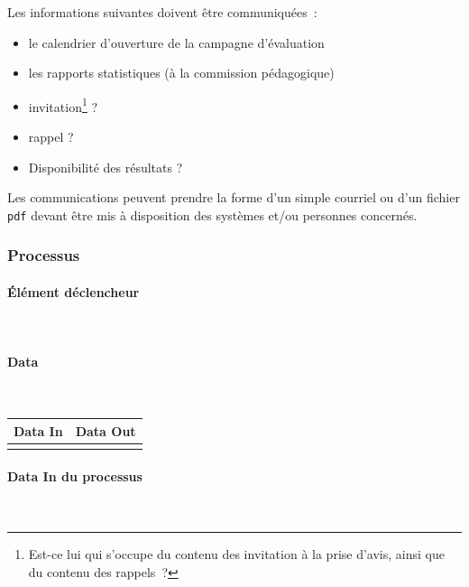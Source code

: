 \documentclass[a4paper,11pt]{report}
\begin{document}
\noindent Les informations suivantes doivent être communiquées~:
\begin{itemize}
	\item le calendrier d'ouverture de la campagne d'évaluation
	\item les rapports statistiques (à la commission pédagogique)
	\item invitation\footnote{Est-ce lui qui s'occupe du contenu des invitation à la prise d'avis, ainsi que du contenu des rappels~?} ?
	\item rappel ?
	\item Disponibilité des résultats ?
\end{itemize}

Les communications peuvent prendre la forme d'un simple courriel ou d'un fichier \texttt{pdf} devant être mis à disposition des systèmes et/ou personnes concernés.


\subsubsection{Processus}
\paragraph{Élément déclencheur}~\newline{}



\paragraph{Data}~\newline{}

\begin{tabularx}{\linewidth}{|X|X|} \hline
Data In & Data Out \\ \hline
 & \\ \hline
\end{tabularx}

\paragraph{Data In du processus}~\newline{}
\end{document}
